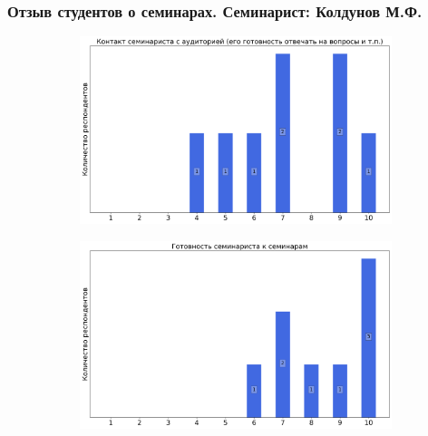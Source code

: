        \subsubsection{Отзыв студентов о семинарах. Семинарист: Колдунов М.Ф.}
            \begin{figure}[H]
                \centering
                \begin{subfigure}[b]{0.45\textwidth}
                    \centering
                    \includegraphics[width=\textwidth]{images/3 course/Общая физика - квантовая физика/seminarists-marks-Колдунов М.Ф.-0.png}
                \end{subfigure}
                \begin{subfigure}[b]{0.45\textwidth}
                    \centering
                    \includegraphics[width=\textwidth]{images/3 course/Общая физика - квантовая физика/seminarists-marks-Колдунов М.Ф.-1.png}
                \end{subfigure}
                \begin{subfigure}[b]{0.45\textwidth}

\end{subfigure}
\end{figure}
